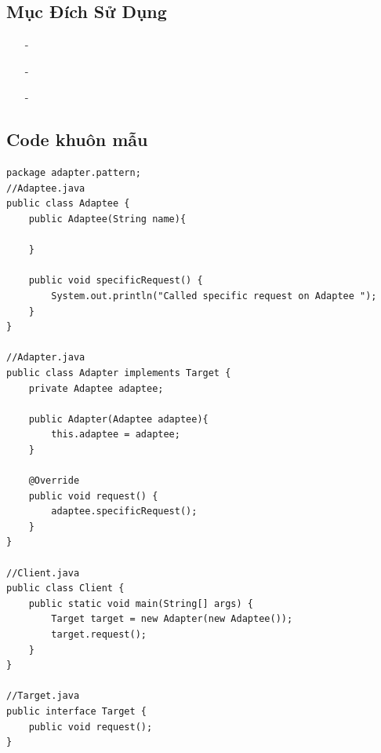 \documentclass{article}
\newcommand\subpara{\fontsize{13}{13}\selectfont \fontseries{b}\selectfont}
\begin{document}
		\subsection{Mục Đích Sử Dụng}
		\begin{itemize}
			\item[-]\subpara{Chuyển đổi interface của một class thành interface mà client yêu cầu}
			\item[-]\subpara{Tạo ra những lớp có khả năng sử dụng lại, chúng phối hợp với các lớp không liên quan hay những lớp không thể đoán trước được và những lớp này không có interface tương thích}
			\item[-]\subpara{Khi muốn đảm bảo nguyên tắc Open/Close trong một ứng dụng}
		\end{itemize}


		\subsection{Code khuôn mẫu}
		\begin{lstlisting}
package adapter.pattern;
//Adaptee.java
public class Adaptee {
    public Adaptee(String name){

    }

    public void specificRequest() {
        System.out.println("Called specific request on Adaptee ");
    }
}

//Adapter.java
public class Adapter implements Target {
    private Adaptee adaptee;

    public Adapter(Adaptee adaptee){
        this.adaptee = adaptee;
    }

    @Override
    public void request() {
        adaptee.specificRequest();
    }
}

//Client.java
public class Client {
    public static void main(String[] args) {
        Target target = new Adapter(new Adaptee());
        target.request();
    }
}

//Target.java
public interface Target {
    public void request();
}
        \end{lstlisting}
\end{document}
